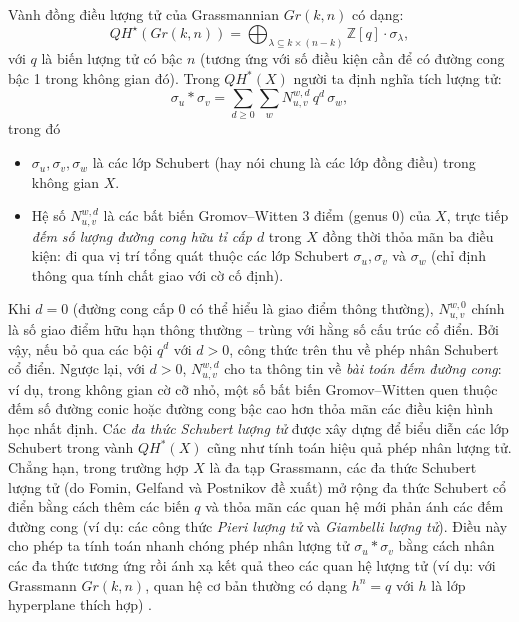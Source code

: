 Vành đồng điều lượng tử của Grassmannian $Gr(k,n)$ có dạng:
$$
QH^\star(Gr(k,n)) = \bigoplus_{\lambda \subseteq k \times (n-k)} \mathbb{Z}[q] \cdot \sigma_\lambda,
$$
với $q$ là biến lượng tử có bậc $n$ (tương ứng với số điều kiện cần để có đường cong bậc 1 trong không gian đó). Trong $QH^*(X)$ người ta định nghĩa tích lượng tử:
$$
\sigma_u * \sigma_v = \sum_{d \geq 0} \sum_w N^{w,d}_{u,v} \, q^d \, \sigma_w,
$$
trong đó
\begin{itemize}
    \item $\sigma_u, \sigma_v, \sigma_w$ là các lớp Schubert (hay nói chung là các lớp đồng điều) trong không gian $X$. 
    \item Hệ số $N^{w,d}_{u,v}$ là các bất biến Gromov–Witten 3 điểm (genus 0) của $X$, trực tiếp \textit{đếm số lượng đường cong hữu tỉ cấp $d$} trong $X$ đồng thời thỏa mãn ba điều kiện: đi qua vị trí tổng quát thuộc các lớp Schubert $\sigma_u, \sigma_v$ và $\sigma_w$ (chỉ định thông qua tính chất giao với cờ cố định). 
\end{itemize}
Khi $d=0$ (đường cong cấp 0 có thể hiểu là giao điểm thông thường), $N^{w,0}_{u,v}$ chính là số giao điểm hữu hạn thông thường – trùng với hằng số cấu trúc cổ điển. Bởi vậy, nếu bỏ qua các bội $q^d$ với $d>0$, công thức trên thu về phép nhân Schubert cổ điển. Ngược lại, với $d>0$, $N^{w,d}_{u,v}$ cho ta thông tin về \textit{bài toán đếm đường cong}: ví dụ, trong không gian cờ cỡ nhỏ, một số bất biến Gromov–Witten quen thuộc đếm số đường conic hoặc đường cong bậc cao hơn thỏa mãn các điều kiện hình học nhất định. Các \textit{đa thức Schubert lượng tử} được xây dựng để biểu diễn các lớp Schubert trong vành $QH^*(X)$ cũng như tính toán hiệu quả phép nhân lượng tử. Chẳng hạn, trong trường hợp $X$ là đa tạp Grassmann, các đa thức Schubert lượng tử (do Fomin, Gelfand và Postnikov đề xuất) mở rộng đa thức Schubert cổ điển bằng cách thêm các biến $q$ và thỏa mãn các quan hệ mới phản ánh các đếm đường cong (ví dụ: các công thức \textit{Pieri lượng tử} và \textit{Giambelli lượng tử}). Điều này cho phép ta tính toán nhanh chóng phép nhân lượng tử $\sigma_u * \sigma_v$ bằng cách nhân các đa thức tương ứng rồi ánh xạ kết quả theo các quan hệ lượng tử (ví dụ: với Grassmann $Gr(k,n)$, quan hệ cơ bản thường có dạng $h^n = q$ với $h$ là lớp hyperplane thích hợp) \cite{buch2001quantumcohomologygrassmannians}. 

